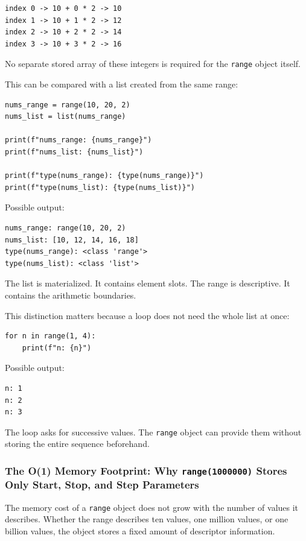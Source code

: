 \documentclass[a4paper,twoside]{report}
\begin{document}
\begin{verbatim}
index 0 -> 10 + 0 * 2 -> 10
index 1 -> 10 + 1 * 2 -> 12
index 2 -> 10 + 2 * 2 -> 14
index 3 -> 10 + 3 * 2 -> 16
\end{verbatim}

No separate stored array of these integers is required for the \texttt{range} object itself.

This can be compared with a list created from the same range:

\begin{verbatim}
nums_range = range(10, 20, 2)
nums_list = list(nums_range)

print(f"nums_range: {nums_range}")
print(f"nums_list: {nums_list}")

print(f"type(nums_range): {type(nums_range)}")
print(f"type(nums_list): {type(nums_list)}")
\end{verbatim}

Possible output:

\begin{verbatim}
nums_range: range(10, 20, 2)
nums_list: [10, 12, 14, 16, 18]
type(nums_range): <class 'range'>
type(nums_list): <class 'list'>
\end{verbatim}

The list is materialized. It contains element slots. The range is descriptive. It contains the arithmetic boundaries.

This distinction matters because a loop does not need the whole list at once:

\begin{verbatim}
for n in range(1, 4):
    print(f"n: {n}")
\end{verbatim}

Possible output:

\begin{verbatim}
n: 1
n: 2
n: 3
\end{verbatim}

The loop asks for successive values. The \texttt{range} object can provide them without storing the entire sequence beforehand.

\subsubsection{The O(1) Memory Footprint: Why \texttt{range(1000000)} Stores Only Start, Stop, and Step Parameters}

The memory cost of a \texttt{range} object does not grow with the number of values it describes. Whether the range describes ten values, one million values, or one billion values, the object stores a fixed amount of descriptor information.
\end{document}
